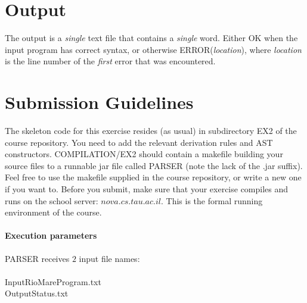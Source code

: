 \documentclass{article}
\begin{document}
\section{Output}
The output is a \textit{single} text file that contains a \textit{single} word.
Either OK when the input program has correct syntax,
or otherwise ERROR(\textit{location}), where \textit{location}
is the line number of the \textit{first} error that was encountered.
\section{Submission Guidelines}
The skeleton code for this exercise resides (as usual)
in subdirectory EX2 of the course repository.
You need to add the relevant derivation rules and AST constructors.
COMPILATION/EX2 should contain a makefile building your source files to a
runnable jar file called PARSER (note the lack of the .jar suffix).
Feel free to use the makefile supplied in the course repository,
or write a new one if you want to. 
Before you submit, make sure that your exercise compiles and runs
on the school server: $nova.cs.tau.ac.il$.
This is the formal running environment of the course.
\paragraph{Execution parameters}
PARSER receives $2$ input file names:\\ \\
InputRioMareProgram.txt\\
OutputStatus.txt
\end{document}

